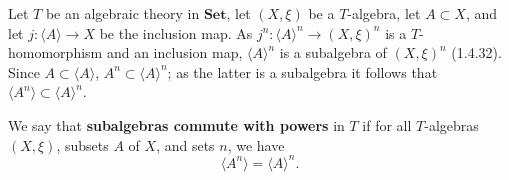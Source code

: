 Let $T$ be an algebraic theory in $\mathbf{Set}$, let $(X, \xi)$ be a $T$-algebra, let $A \subset X$, and let $j \colon \langle A \rangle \to X$ be the inclusion map. As $j^n \colon \langle A \rangle^n \to (X, \xi)^n$ is a $T$-homomorphism and an inclusion map, $\langle A \rangle^n$ is a subalgebra of $(X, \xi)^n$ (1.4.32). Since $A \subset \langle A \rangle$, $A^n \subset \langle A \rangle^n$; as the latter is a subalgebra it follows that $\langle A^n \rangle \subset \langle A \rangle^n$.

We say that \textbf{subalgebras commute with powers} in $T$ if for all $T$-algebras $(X, \xi)$, subsets $A$ of $X$, and sets $n$, we have
$$\langle A^n \rangle = \langle A \rangle^n.$$
